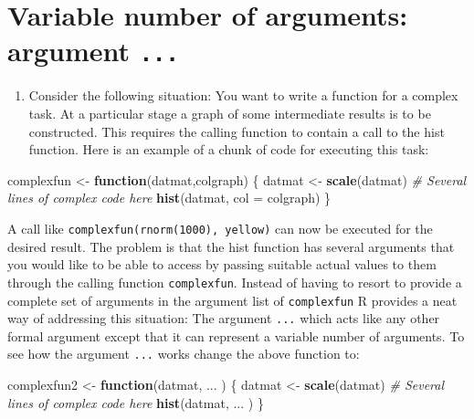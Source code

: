 \documentclass[
]{book}
\newenvironment{Shaded}{\begin{snugshade}}{\end{snugshade}}
\newcommand{\AttributeTok}[1]{\textcolor[rgb]{0.13,0.29,0.53}{#1}}
\newcommand{\CommentTok}[1]{\textcolor[rgb]{0.56,0.35,0.01}{\textit{#1}}}
\newcommand{\ControlFlowTok}[1]{\textcolor[rgb]{0.13,0.29,0.53}{\textbf{#1}}}
\newcommand{\FunctionTok}[1]{\textcolor[rgb]{0.13,0.29,0.53}{\textbf{#1}}}
\newcommand{\NormalTok}[1]{#1}
\newcommand{\OtherTok}[1]{\textcolor[rgb]{0.56,0.35,0.01}{#1}}
\providecommand{\tightlist}{%
  \setlength{\itemsep}{0pt}\setlength{\parskip}{0pt}}
\begin{document}
\section{\texorpdfstring{Variable number of arguments: argument \texttt{...}}{Variable number of arguments: argument ...}}\label{variable-number-of-arguments-argument-...}

\begin{enumerate}
\def\labelenumi{(\alph{enumi})}
\tightlist
\item
  Consider the following situation: You want to write a function for a complex task. At a particular stage a graph of some intermediate results is to be constructed. This requires the calling function to contain a call to the hist function. Here is an example of a chunk of code for executing this task:
\end{enumerate}

\begin{Shaded}
\begin{Highlighting}[]
\NormalTok{complexfun }\OtherTok{\textless{}{-}} \ControlFlowTok{function}\NormalTok{(datmat,colgraph)}
\NormalTok{    \{ datmat }\OtherTok{\textless{}{-}} \FunctionTok{scale}\NormalTok{(datmat) }
       \CommentTok{\# Several lines of complex code here }
      \FunctionTok{hist}\NormalTok{(datmat, }\AttributeTok{col =}\NormalTok{ colgraph)              \}}
\end{Highlighting}
\end{Shaded}

A call like \texttt{complexfun(rnorm(1000),\ \textquotesingle{}yellow\textquotesingle{})} can now be executed for the desired result. The problem is that the hist function has several arguments that you would like to be able to access by passing suitable actual values to them through the calling function \texttt{complexfun}. Instead of having to resort to provide a complete set of arguments in the argument list of \texttt{complexfun} R provides a neat way of addressing this situation: The argument \texttt{...} which acts like any other formal argument except that it can represent a variable number of arguments. To see how the argument \texttt{...} works change the above function to:

\begin{Shaded}
\begin{Highlighting}[]
\NormalTok{complexfun2 }\OtherTok{\textless{}{-}} \ControlFlowTok{function}\NormalTok{(datmat, ... )}
\NormalTok{ \{ datmat }\OtherTok{\textless{}{-}} \FunctionTok{scale}\NormalTok{(datmat) }
       \CommentTok{\# Several lines of complex code here }
   \FunctionTok{hist}\NormalTok{(datmat, ... )    \}}
\end{Highlighting}
\end{Shaded}
\end{document}
